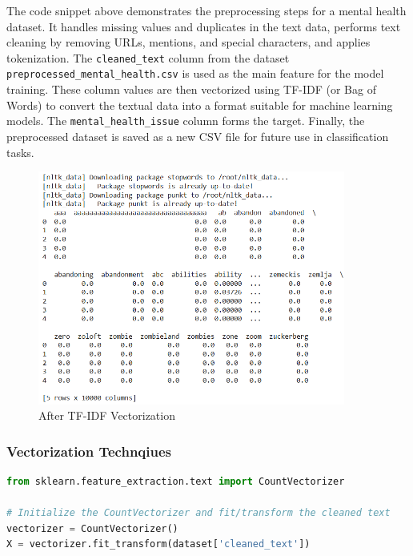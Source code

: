\noindent
The code snippet above demonstrates the preprocessing steps for a mental health dataset. It handles missing values and duplicates in the text data, performs text cleaning by removing URLs, mentions, and special characters, and applies tokenization. The \texttt{cleaned\_text} column from the dataset \texttt{preprocessed\_mental\_health.csv} is used as the main feature for the model training. These column values are then vectorized using TF-IDF (or Bag of Words) to convert the textual data into a format suitable for machine learning models. The \texttt{mental\_health\_issue} column forms the target. Finally, the preprocessed dataset is saved as a new CSV file for future use in classification tasks.


\begin{figure}[h!]  
    \centering
    \includegraphics[width=0.9\textwidth]{Images/Data Cleaning and Preprocessing.png}  
    \caption{After TF-IDF Vectorization}
    \label{Data Collection and Preprocessing}  %
\end{figure}


\subsubsection{Vectorization Technqiues}

\begin{tcolorbox}[colback=gray!5!white, colframe=gray!80!black, boxrule=0.5pt, title=Bag of Words]
\begin{lstlisting}[language=Python]
from sklearn.feature_extraction.text import CountVectorizer

# Initialize the CountVectorizer and fit/transform the cleaned text
vectorizer = CountVectorizer()
X = vectorizer.fit_transform(dataset['cleaned_text'])
\end{lstlisting}
\end{tcolorbox}

